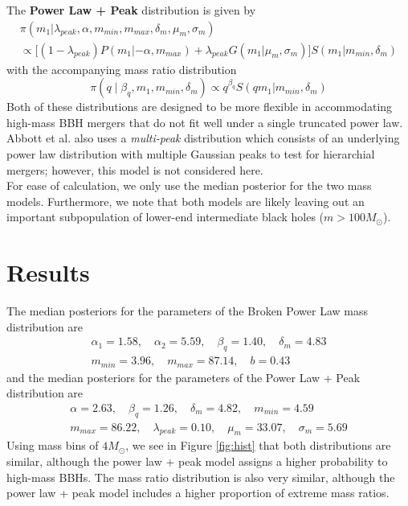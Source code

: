 \documentclass{article}
\begin{document}
The \textbf{Power Law + Peak} distribution is given by 
\begin{multline}
    \pi (m_1 | \lambda_{peak}, \alpha, m_{min}, m_{max}, \delta_m, \mu_m, \sigma_m) \\
    \propto \Big[ (1 - \lambda_{peak}) P(m_1 | -\alpha, m_{max}) + \lambda_{peak} G(m_1 | \mu_m, \sigma_m) \Big] S(m_1 | m_{min}, \delta_m)
\end{multline}
with the accompanying mass ratio distribution 
\begin{equation}
    \pi(q \; | \; \beta_q, m_1, m_{min}, \delta_m) \propto q^{\beta_q} S(qm_1 | m_{min}, \delta_m)
\end{equation}
Both of these distributions are designed to be more flexible in accommodating high-mass BBH mergers that do not fit well under a single truncated power law. Abbott et al. also uses a \textit{multi-peak} distribution which consists of an underlying power law distribution with multiple Gaussian peaks to test for hierarchial mergers; however, this model is not considered here. \\

For ease of calculation, we only use the median posterior for the two mass models. Furthermore, we note that both models are likely leaving out an important subpopulation of lower-end intermediate black holes ($m > 100 M_\odot$).

\newpage



\section{Results}

The median posteriors for the parameters of the Broken Power Law mass distribution are 
\begin{equation}
    \begin{gathered}
        \alpha_1 = 1.58, \quad \alpha_2 = 5.59, \quad \beta_q = 1.40, \quad \delta_m = 4.83 \\
        m_{min} = 3.96, \quad m_{max} = 87.14, \quad b = 0.43
    \end{gathered}
\end{equation}
and the median posteriors for the parameters of the Power Law + Peak distribution are 
\begin{equation}
    \begin{gathered}
        \alpha = 2.63, \quad \beta_q = 1.26, \quad \delta_m = 4.82, \quad m_{min} = 4.59 \\
        m_{max} = 86.22, \quad \lambda_{peak} = 0.10, \quad \mu_m = 33.07, \quad \sigma_m = 5.69
    \end{gathered}
\end{equation}
Using mass bins of $4 M_\odot$, we see in Figure \ref{fig:hist} that both distributions are similar, although the power law + peak model assigns a higher probability to high-mass BBHs. The mass ratio distribution is also very similar, although the power law + peak model includes a higher proportion of extreme mass ratios. \\
\end{document}
